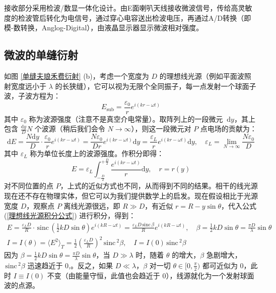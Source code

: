 \documentclass[UTF8]{article}
\def\sinc{\mathrm{\,sinc}\,}
\theoremstyle{MyLineTheoremStyle} %
\theoremstyle{MyBlockTheoremStyle} %
\theoremstyle{MySubsubsectionStyle} %
\begin{document}
接收部分采用检波/数显一体化设计。由E面喇叭天线接收微波信号，传给高灵敏度的检波管后转化为电信号，通过穿心电容送出检波电压，再通过A/D转换（即模-数转换，Anglog-Digital），由液晶显示器显示微波相对强度。

\subsection{微波的单缝衍射}

如图 \ref{单缝夫琅禾费衍射} (b)，考虑一个宽度为 $D$ 的理想线光源（例如平面波照射宽度远小于 $\lambda$ 的长狭缝），它可以视为无限个全同振子，每一点发射一个球面子波，子波方程为：
\begin{equation}
E_{\text{sub}} = \frac{\varepsilon_0}{r}e^{i(kr - \omega t)}
\end{equation}
其中 $\varepsilon_0$ 称为波源强度（注意不是真空介电常量）。取阵列上的一段微元 $\ \mathrm{d}y$，其上包含 $\frac{\mathrm{d}y}{D}N$ 个波源（稍后我们会令 $N \to \infty$），则这一段微元对 $P$ 点电场的贡献为：
\begin{equation}
\mathrm{d}E = \frac{N\mathrm{d}y}{D}\cdot \frac{\varepsilon_0}{r}e^{i(kr - \omega t)} = \frac{N\varepsilon_0}{Dr}e^{i(kr - \omega t)} \mathrm{d}y = \frac{\varepsilon_L}{r}e^{i(kr - \omega t)} \mathrm{d}y,\quad \varepsilon_L = \lim_{N\to \infty} \frac{N\varepsilon_0}{D}
\end{equation}
其中 $\varepsilon_L$ 称为单位长度上的波源强度。作积分即得：
\begin{equation}\label{理想线光源积分公式}
E = \varepsilon_L \int_{-\frac{D}{2}}^{+\frac{D}{2}} \frac{e^{i(kr - \omega t)}}{r} \mathrm{d}y,\quad r = r(y)
\end{equation}
对不同位置的点 $P$，上式的近似方式也不同，从而得到不同的结果。相干的线光源现在还不存在物理实体，但它可以为我们提供数学上的启发。现在假设相比于光源宽度 $D$，观察点 $P$ 离线光源很远，即 $R \gg D$，有近似 $r = R - y\sin \theta$，代入公式 (\ref{理想线光源积分公式}) 进行积分，得到：
\begin{gather}
E = \frac{\varepsilon_L D}{R}\cdot \sinc \left(\frac{1}{2}kD \sin \theta\right) e^{i\left(kR - \omega t\right)}
= \frac{\varepsilon_L D \sinc \beta}{R}  e^{i\left(kR - \omega t\right)},\quad \beta = \frac{1}{2}kD \sin \theta = \frac{\pi D}{\lambda} \sin \theta\\ 
I = I(\theta)= \langle E^2  \rangle_T = \frac{1}{2}\left(\frac{\varepsilon_L D}{R}\right)^2 \sinc^2 \beta,\quad I = I(0) \sinc^2 \beta
\end{gather}
因为 $\beta = \frac{1}{2}kD \sin \theta = \frac{\pi D}{\lambda} \sin \theta $，当 $D \gg \lambda$ 时，随着 $\theta$ 的增大，$\beta$ 急剧增大，$\sinc^2 \beta$ 迅速趋近于 0,。反之，如果 $D \ll \lambda$，$\beta$ 对一切 $\theta \in [0, \frac{\pi}{2})$ 都可近似为 0，此时 $I \equiv I(0)$ 不变（由能量守恒，此值也会趋近于 0），线源就化为一个发射球面波的点源。
\end{document}
